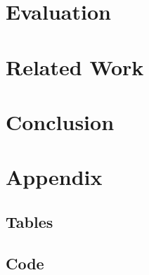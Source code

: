 \documentclass[11pt,a4paper]{book}
\begin{document}
\chapter{Evaluation}
\label{s:Evaluation}


\chapter{Related Work}
\label{s:Related Work}


\chapter{Conclusion}
\label{s:Conclusion}


\appendix
\chapter{Appendix}
\section{Tables}
\label{appendix:tables}


\newpage
\section{Code}
\label{appendix:code snippets}





\end{document}
